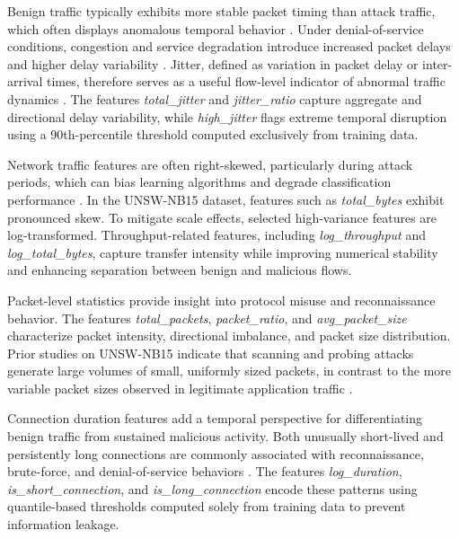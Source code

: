 \documentclass[pdflatex,sn-mathphys-num]{sn-jnl}
\theoremstyle{thmstyleone}%
\theoremstyle{thmstyletwo}%
\theoremstyle{thmstylethree}%
\begin{document}
Benign traffic typically exhibits more stable packet timing than attack traffic, which often displays anomalous temporal behavior \cite{andrecut2022attackvsbenignnetwork}. Under denial-of-service conditions, congestion and service degradation introduce increased packet delays and higher delay variability \cite{Zhang2007LowRateDoS}. Jitter, defined as variation in packet delay or inter-arrival times, therefore serves as a useful flow-level indicator of abnormal traffic dynamics \cite{Chen2004}. The features \textit{total\_jitter} and \textit{jitter\_ratio} capture aggregate and directional delay variability, while \textit{high\_jitter} flags extreme temporal disruption using a 90th-percentile threshold computed exclusively from training data.

Network traffic features are often right-skewed, particularly during attack periods, which can bias learning algorithms and degrade classification performance \cite{Lakhina2004}. In the UNSW-NB15 dataset, features such as \textit{total\_bytes} exhibit pronounced skew. To mitigate scale effects, selected high-variance features are log-transformed. Throughput-related features, including \textit{log\_throughput} and \textit{log\_total\_bytes}, capture transfer intensity while improving numerical stability and enhancing separation between benign and malicious flows.

Packet-level statistics provide insight into protocol misuse and reconnaissance behavior. The features \textit{total\_packets}, \textit{packet\_ratio}, and \textit{avg\_packet\_size} characterize packet intensity, directional imbalance, and packet size distribution. Prior studies on UNSW-NB15 indicate that scanning and probing attacks generate large volumes of small, uniformly sized packets, in contrast to the more variable packet sizes observed in legitimate application traffic \cite{Sarhan10_1007}.

Connection duration features add a temporal perspective for differentiating benign traffic from sustained malicious activity. Both unusually short-lived and persistently long connections are commonly associated with reconnaissance, brute-force, and denial-of-service behaviors \cite{Tavallaee2009, RING2019147}. The features \textit{log\_duration}, \textit{is\_short\_connection}, and \textit{is\_long\_connection} encode these patterns using quantile-based thresholds computed solely from training data to prevent information leakage.
\end{document}

